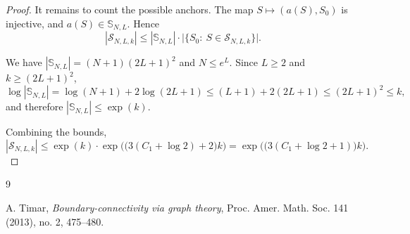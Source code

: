 \documentclass[11pt]{amsart}
\theoremstyle{definition}
\numberwithin{equation}{section}
\newcommand{\Sbb}{\mathbb{S}}
\newcommand{\1}{\mathbbm{1}}
\begin{document}
\begin{proof}
It remains to count the possible anchors. The map $S\mapsto (a(S),S_0)$ is
injective, and $a(S)\in \Sbb_{N,L}$. Hence
\[
|\mathcal S_{N,L,k}|\le |\Sbb_{N,L}|\cdot \bigl|\{S_0:\ S\in \mathcal S_{N,L,k}\}\bigr|.
\]

We have $|\Sbb_{N,L}|=(N+1)(2L+1)^2$ and $N\le e^L$. Since
$L\ge 2$ and $k\ge (2L+1)^2$,
\[
\log|\Sbb_{N,L}|
= \log(N+1)+2\log(2L+1)
\le (L+1)+2(2L+1)
\le (2L+1)^2
\le k,
\]
and therefore $|\Sbb_{N,L}|\le \exp(k)$.

Combining the bounds,
\[
|\mathcal S_{N,L,k}|
\le \exp(k)\cdot \exp\bigl(\bigl(3(C_1+\log 2)+2\bigr)k\bigr) =\exp\bigl(\bigl(3(C_1+\log 2+1)\bigr)k\bigr).
\]
\end{proof}

\begin{thebibliography}{9}

A. Timar,
\emph{Boundary-connectivity via graph theory},
Proc. Amer. Math. Soc. 141 (2013), no. 2, 475--480.

\end{thebibliography}
\end{document}
